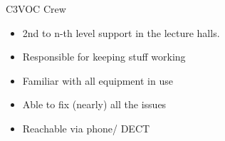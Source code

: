 
\begin{frame}{C3VOC Crew}
	\begin{itemize}
		\item 2nd to n-th level support in the lecture halls.
		\item Responsible for keeping stuff working
		\item Familiar with all equipment in use
		\item Able to fix (nearly) all the issues
		\item Reachable via phone/ DECT
	\end{itemize}
\end{frame}
